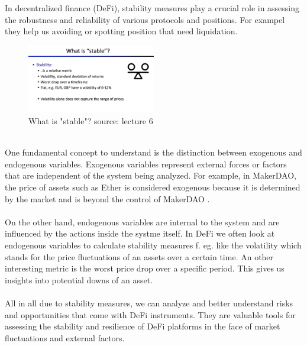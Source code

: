 \documentclass{article}
\begin{document}
In decentralized finance (DeFi), stability measures play a crucial role in assessing the robustness and reliability of various protocols and positions. For exampel they help us avoiding or spotting position that need liquidation.\begin{figure}[h]
    \centering
    \includegraphics[width=0.5\textwidth]{Bildschirmfoto 2024-04-07 um 17.44.29.png} 
    \caption{What is "stable"? \scriptsize{source: lecture 6}}
    \label{fig:DoS-attack}
\end{figure}\\
One fundamental concept to understand is the distinction between exogenous and endogenous variables. Exogenous variables represent external forces or factors that are independent of the system being analyzed. For example, in MakerDAO, the price of assets such as Ether is considered exogenous because it is determined by the market and is  beyond the control of MakerDAO .\\\\On the other hand, endogenous variables are internal to the system and are influenced by the actions inside the systme itself. In DeFi we often look at endogenous variables to calculate stability measures f. eg. like the volatility which stands for the price fluctuations of an assets over a certain time. An other interesting metric is the  worst price drop over a specific period. This gives us insights into potential downs of an   asset. \\\\ All in all due to stability measures, we can analyze and better understand risks and opportunities that come with DeFi instruments. They are valuable tools for assessing the stability and resilience of DeFi platforms in the face of market fluctuations and external factors.\\
\end{document}
